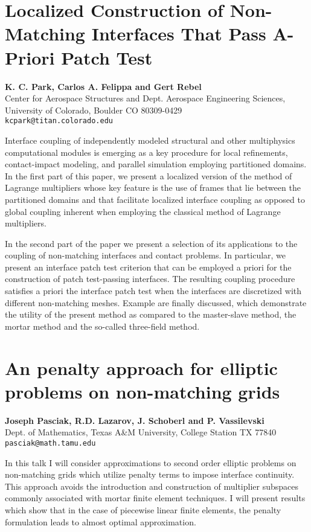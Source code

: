 \documentclass[11pt]{article}
\newcommand{\nextab}[4]{
	\section{#2}
	{\bf #1} \\ \nopagebreak
	{#3} \\ \nopagebreak
	{\tt #4} \nopagebreak
	}
\begin{document}

\nextab
{K. C. Park, Carlos A. Felippa  and Gert Rebel}
{Localized Construction of Non-Matching Interfaces That  Pass A-Priori  Patch Test}
{Center for Aerospace Structures and Dept. Aerospace Engineering Sciences, University of Colorado, Boulder CO 80309-0429}
{kcpark@titan.colorado.edu}


Interface coupling of independently modeled structural and other
multiphysics computational modules is emerging as a key procedure for
local refinements, contact-impact modeling, and parallel simulation
employing partitioned domains. In the first part of this paper, we
present a localized version of the method of Lagrange multipliers whose
key feature  is the use of frames that
lie between the partitioned domains and that facilitate localized
interface coupling as opposed to global coupling inherent when employing
the classical method of Lagrange multipliers.

In the second part of the paper we present a selection of its
applications to the coupling of non-matching interfaces and contact
problems. In particular, we present an interface patch test criterion
that can be employed a priori for the construction of patch test-passing
interfaces.  The resulting coupling procedure satisfies a priori the
interface patch test when the interfaces are discretized with different
non-matching meshes. Example are finally discussed, which demonstrate the
utility of the present method as compared to the master-slave method, the
mortar method and the so-called three-field method.




\nextab
{Joseph Pasciak, R.D. Lazarov, J. Schoberl and P. Vassilevski}
{An penalty approach for elliptic problems on non-matching grids}
{Dept. of Mathematics, Texas A\&M University, College Station TX 77840}
{pasciak@math.tamu.edu}


In this talk I will consider approximations to second order elliptic
problems on non-matching grids which utilize penalty terms to
impose interface continuity.  This approach avoids the introduction and
construction of multiplier subspaces commonly associated with mortar
finite element techniques.
I will present results which
show that in the case of piecewise linear finite elements,
the penalty formulation leads to almost optimal approximation.
\end{document}
